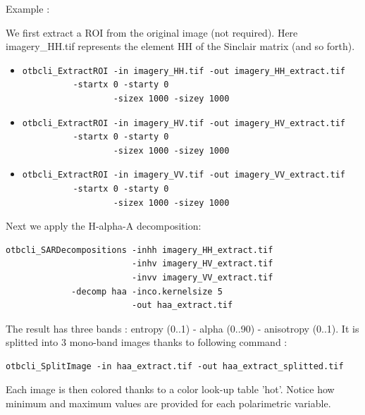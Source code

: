 Example :

We first extract a ROI from the original image (not required). 
Here imagery\_HH.tif represents the element HH of the Sinclair matrix (and so forth).

\begin{itemize}
\item 
\begin{verbatim} 
otbcli_ExtractROI -in imagery_HH.tif -out imagery_HH_extract.tif  
		  -startx 0 -starty 0 
                  -sizex 1000 -sizey 1000 
\end{verbatim}
									  
\item 
\begin{verbatim} 
otbcli_ExtractROI -in imagery_HV.tif -out imagery_HV_extract.tif  
		  -startx 0 -starty 0
                  -sizex 1000 -sizey 1000 
\end{verbatim}
									  
\item 
\begin{verbatim} 
otbcli_ExtractROI -in imagery_VV.tif -out imagery_VV_extract.tif  
		  -startx 0 -starty 0
                  -sizex 1000 -sizey 1000 
\end{verbatim}
\end{itemize}

Next we apply the H-alpha-A decomposition:

\begin{verbatim} 
otbcli_SARDecompositions -inhh imagery_HH_extract.tif 
                         -inhv imagery_HV_extract.tif 
                         -invv imagery_VV_extract.tif 
			 -decomp haa -inco.kernelsize 5 
                         -out haa_extract.tif 
\end{verbatim}

The result has three bands : entropy (0..1) - alpha (0..90) - anisotropy
(0..1). It is splitted into 3 mono-band images thanks to following command :

\begin{verbatim} 
otbcli_SplitImage -in haa_extract.tif -out haa_extract_splitted.tif 
\end{verbatim}

Each image is then colored thanks to a color look-up table 'hot'. 
Notice how minimum and maximum values are provided for each polarimetric variable.

